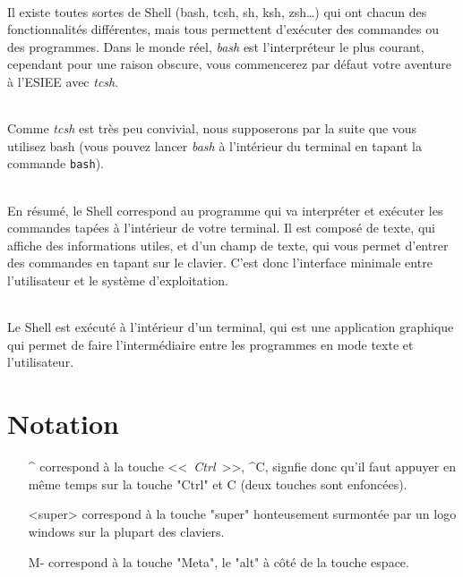 \documentclass[french, a4paper, 12pt, titlepage]{article}
\begin{document}
\paragraph{} Il existe toutes sortes de Shell (bash, tcsh, sh, ksh, zsh\dots)
qui ont chacun des fonctionnalités différentes, mais tous permettent d'exécuter
des commandes ou des programmes. Dans le monde réel, \emph{bash} est
l'interpréteur le plus courant, cependant pour une raison obscure, vous
commencerez par défaut votre aventure à l'ESIEE avec \emph{tcsh}.

\paragraph{} Comme \emph{tcsh} est très peu convivial, nous supposerons par la
suite que vous utilisez bash (vous pouvez lancer \emph{bash} à l'intérieur du
terminal en tapant la commande \texttt{bash}).

\paragraph{} En résumé, le Shell correspond au programme qui va interpréter et
exécuter les commandes tapées à l'intérieur de votre terminal. Il est composé
de texte, qui affiche des informations utiles, et d'un champ de texte, qui vous
permet d'entrer des commandes en tapant sur le clavier. C'est donc l'interface
minimale entre l'utilisateur et le système d'exploitation.

\paragraph{} Le Shell est exécuté à l'intérieur d'un terminal, qui est une
application graphique qui permet de faire l'intermédiaire entre les programmes
en mode texte et l'utilisateur.

\part{Notation}

\begin{enumerate}
	\item[\^{}] correspond à la touche <<~\emph{Ctrl}~>>, \^{}C, signfie donc
		qu'il faut appuyer en même temps sur la touche "Ctrl" et C (deux
		touches sont enfoncées).
	\item [<super>] correspond à la touche "super" honteusement surmontée par
		un logo windows sur la plupart des claviers.
	\item [M-] correspond à la touche "Meta", le "alt" à côté de la touche
		espace.
\end{enumerate}
\end{document}
